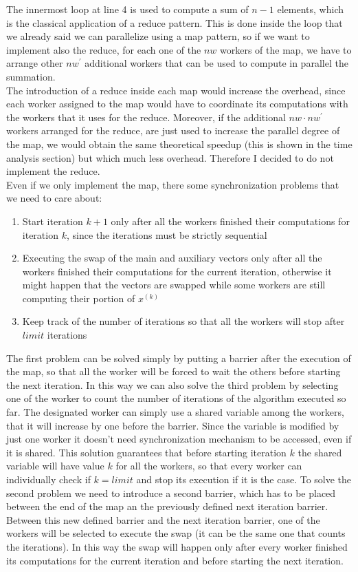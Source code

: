 \documentclass[12pt]{article}
\begin{document}
	The innermost loop at line 4 is used to compute a sum of $n-1$ elements, which is the classical application of a reduce pattern. This is done inside the loop that we already said we can parallelize using a map pattern, so if we want to implement also the reduce, for each one of the $nw$ workers of the map, we have to arrange other $nw^\prime$ additional workers that can be used to compute in parallel the summation.\\
	The introduction of a reduce inside each map would increase the overhead, since each worker assigned to the map would have to coordinate its computations with the workers that it uses for the reduce. Moreover, if the additional $nw\cdot nw^\prime$ workers arranged for the reduce, are just used to increase the parallel degree of the map, we would obtain the same theoretical speedup (this is shown in the time analysis section) but which much less overhead. Therefore I decided to do not implement the reduce.\\
	Even if we only implement the map, there some synchronization problems that we need to care about:
	\begin{enumerate}
		\item Start iteration $k+1$ only after all the workers finished their computations for iteration $k$, since the iterations must be strictly sequential 
		\item Executing the swap of the main and auxiliary vectors only after all the workers finished their computations for the current iteration, otherwise it might happen that the vectors are swapped while some workers are still computing their portion of $x^{(k)}$
		\item Keep track of the number of iterations so that all the workers will stop after $limit$ iterations
	\end{enumerate}
	The first problem can be solved simply by putting a barrier after the execution of the map, so that all the worker will be forced to wait the others before starting the next iteration. In this way we can also solve the third problem by selecting one of the worker to count the number of iterations of the algorithm executed so far. The designated worker can simply use a shared variable among the workers, that it will increase by one before the barrier. Since the variable is modified by just one worker it doesn't need synchronization mechanism to be accessed, even if it is shared. This solution guarantees that before starting iteration $k$ the shared variable will have value $k$ for all the workers, so that every worker can individually check if $k = limit$ and stop its execution if it is the case. To solve the second problem we need to introduce a second barrier, which has to be placed between the end of the map an the previously defined next iteration barrier. Between this new defined barrier and the next iteration barrier, one of the workers will be selected to execute the swap (it can be the same one that counts the iterations). In this way the swap will happen only after every worker finished its computations for the current iteration and before starting the next iteration.\\
\end{document}
